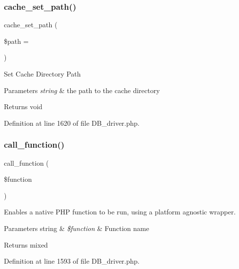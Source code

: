 \subsubsection{\texorpdfstring{cache\_set\_path()}{cache\_set\_path()}}
{\footnotesize\ttfamily cache\+\_\+set\+\_\+path (\begin{DoxyParamCaption}\item[{}]{\$path = {\ttfamily \textquotesingle{}\textquotesingle{}} }\end{DoxyParamCaption})}

Set Cache Directory Path


\begin{DoxyParams}{Parameters}
{\em string} & the path to the cache directory \\
\hline
\end{DoxyParams}
\begin{DoxyReturn}{Returns}
void 
\end{DoxyReturn}


Definition at line 1620 of file D\+B\+\_\+driver.\+php.

\mbox{\label{class_c_i___d_b__driver_af7892f758c89d0e243def92140dbe099}} 
\subsubsection{\texorpdfstring{call\_function()}{call\_function()}}
{\footnotesize\ttfamily call\+\_\+function (\begin{DoxyParamCaption}\item[{}]{\$function }\end{DoxyParamCaption})}

Enables a native P\+HP function to be run, using a platform agnostic wrapper.


\begin{DoxyParams}[1]{Parameters}
string & {\em \$function} & Function name \\
\hline
\end{DoxyParams}
\begin{DoxyReturn}{Returns}
mixed 
\end{DoxyReturn}


Definition at line 1593 of file D\+B\+\_\+driver.\+php.

\mbox{\label{class_c_i___d_b__driver_aa69c8bf1f1dcf4e72552efff1fe3e87e}} 
